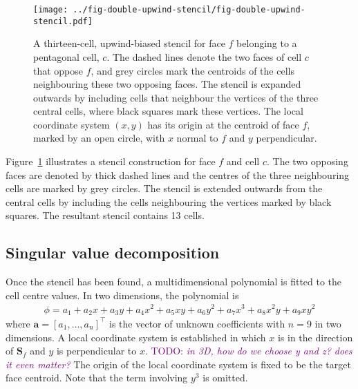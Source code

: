 \documentclass{article}
\newcommand{\TODO}[1]{\textcolor{purple}{TODO: \emph{#1}}}
\begin{document}
\begin{figure}
	\centering
	\texttt{[image: ../fig-double-upwind-stencil/fig-double-upwind-stencil.pdf]}
	\caption{A thirteen-cell, upwind-biased stencil for face $f$ belonging to a pentagonal cell, $c$.  The dashed lines denote the two faces of cell $c$ that oppose $f$, and grey circles mark the centroids of the cells neighbouring these two opposing faces.  The stencil is expanded outwards by including cells that neighbour the vertices of the three central cells, where black squares mark these vertices.  The local coordinate system $(x, y)$ has its origin at the centroid of face $f$, marked by an open circle, with $x$ normal to $f$ and $y$ perpendicular.}
	\label{fig:double-upwind-stencil}
\end{figure}

Figure~\ref{fig:double-upwind-stencil} illustrates a stencil construction for face $f$ and cell $c$.  The two opposing faces are denoted by thick dashed lines and the centres of the three neighbouring cells are marked by grey circles.  The stencil is extended outwards from the central cells by including the cells neighbouring the vertices marked by black squares.  The resultant stencil contains 13 cells.

\subsection{Singular value decomposition}
Once the stencil has been found, a multidimensional polynomial is fitted to the cell centre values.
In two dimensions, the polynomial is
\begin{align}
	\phi = a_1 + a_2 x + a_3 y + a_4 x^2 + a_5 xy + a_6 y^2 + a_7 x^3 + a_8 x^2 y + a_9 x y^2
\end{align}
where $\mathbf{a} = [a_1, \ldots, a_n]^\intercal$ is the vector of unknown coefficients with $n=9$ in two dimensions.  A local coordinate system is established in which $x$ is in the direction of $\mathbf{S}_f$ and $y$ is perpendicular to $x$.
\TODO{in 3D, how do we choose y and z? does it even matter?}
The origin of the local coordinate system is fixed to be the target face centroid.
Note that the term involving $y^3$ is omitted.
\end{document}
